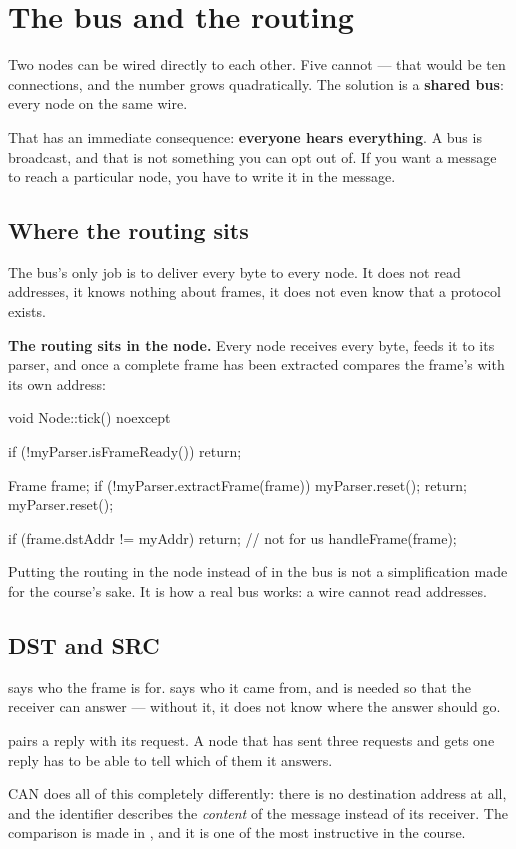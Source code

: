 \section{The bus and the routing}
\label{sec:bus}

Two nodes can be wired directly to each other. Five cannot --- that would be ten connections, and
the number grows quadratically. The solution is a \textbf{shared bus}: every node on the same
wire.

That has an immediate consequence: \textbf{everyone hears everything}. A bus is broadcast, and
that is not something you can opt out of. If you want a message to reach a particular node, you
have to write it in the message.

\subsection{Where the routing sits}

The bus's only job is to deliver every byte to every node. It does not read addresses, it knows
nothing about frames, it does not even know that a protocol exists.

\textbf{The routing sits in the node.} Every node receives every byte, feeds it to its parser,
and once a complete frame has been extracted compares the frame's  with its own
address:

\begin{cppcode}
void Node::tick() noexcept
{
    if (!myParser.isFrameReady()) { return; }

    Frame frame{};
    if (!myParser.extractFrame(frame)) { myParser.reset(); return; }
    myParser.reset();

    if (frame.dstAddr != myAddr) { return; }   // not for us
    handleFrame(frame);
}
\end{cppcode}

Putting the routing in the node instead of in the bus is not a simplification made for the
course's sake. It is how a real bus works: a wire cannot read addresses.

\subsection{DST and SRC}

 says who the frame is for.  says who it came from, and is needed so that the
receiver can answer --- without it, it does not know where the answer should go.

 pairs a reply with its request. A node that has sent three requests and gets one reply
has to be able to tell which of them it answers.

\begin{aside}
\note CAN does all of this completely differently: there is no destination address at all, and
the identifier describes the \emph{content} of the message instead of its receiver. The comparison
is made in , and it is one of the most instructive in the course.
\end{aside}
